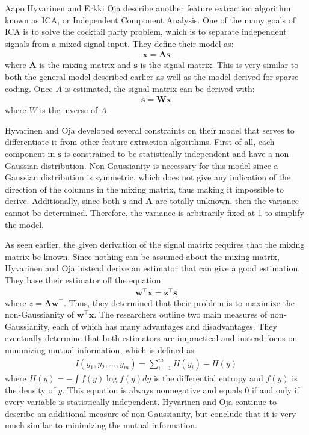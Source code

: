 \documentclass{article}
\newcommand{\vect}[1]{\mathbf{#1}}
\newcommand{\matr}[1]{\mathbf{#1}}
\newcommand{\vx}[0]{\vect{x}}
\newcommand{\vz}[0]{\vect{z}}
\newcommand{\vw}[0]{\vect{w}}
\newcommand{\vs}[0]{\vect{s}}
\newcommand{\mW}[0]{\matr{W}}
\newcommand{\mA}{\matr{A}}
\begin{document}
Aapo Hyvarinen and Erkki Oja describe another feature extraction algorithm known as ICA, or Independent Component Analysis. One of the many goals of ICA is to solve the cocktail party problem, which is to separate independent signals from a mixed signal input. They define their model as:
\begin{align*}
   \vx = \mA \vs
\end{align*}
where $\mA$ is the mixing matrix and $\vs$ is the signal matrix. This is very similar to both the general model described earlier as well as the model derived for sparse coding. Once $A$ is estimated, the signal matrix can be derived with:
\begin{align*}
   \vs = \mW \vx
\end{align*}
where $W$ is the inverse of $A$.

Hyvarinen and Oja developed several constraints on their model that serves to differentiate it from other feature extraction algorithms. First of all, each component in $\vs$ is constrained to be statistically independent and have a non-Gaussian distribution. Non-Gaussianity is necessary for this model since a Gaussian distribution is symmetric, which does not give any indication of the direction of the columns in the mixing matrix, thus making it impossible to derive. Additionally, since both $\vs$ and $\mA$ are totally unknown, then the variance cannot be determined. Therefore, the variance is arbitrarily fixed at 1 to simplify the model. 

As seen earlier, the given derivation of the signal matrix requires that the mixing matrix be known. Since nothing can be assumed about the mixing matrix, Hyvarinen and Oja instead derive an estimator that can give a good estimation. They base their estimator off the equation:
\begin{align*}
   \vw^\top \vx = \vz^\top \vs
\end{align*}
where $z = \mA \vw^\top$. Thus, they determined that their problem is to maximize the non-Gaussianity of $\vw^\top \vx$. The researchers outline two main measures of non-Gaussianity, each of which has many advantages and disadvantages. They eventually determine that both estimators are impractical and instead focus on minimizing mutual information, which is defined as:
\begin{align*}
   I(y_1, y_2, \ldots , y_m) = \sum_{i=1}^{m} H(y_i) - H(y)
\end{align*}
where $H(y) = - \int f(y) \log f(y) dy$ is the differential entropy and $f(y)$ is the density of $y$. This equation is always nonnegative and equals 0 if and only if every variable is statistically independent. Hyvarinen and Oja continue to describe an additional measure of non-Gaussianity, but conclude that it is very much similar to minimizing the mutual information.
\end{document}
